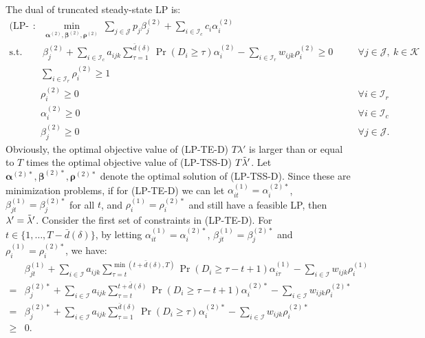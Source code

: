 \documentclass[letterpaper, 10 pt, conference]{ieeeconf}  %
\makeatletter
\renewenvironment{proof}[1][\relax]{\par
  \pushQED{\qed}%
  \normalfont \topsep6\p@\@plus6\p@\relax
  \trivlist
  \item[\hskip\labelsep\itshape
    \ifx#1\relax \proofname\else\proofname{} of #1\fi\@addpunct{.}]\ignorespaces
}{%
  \popQED\endtrivlist\@endpefalse
}
\newcommand{\III}{\mathcal{I}}
\newcommand{\JJJ}{\mathcal{J}}
\newcommand{\KKK}{\mathcal{K}}
\theoremstyle{plain}
\theoremstyle{definition}
\theoremstyle{remark}
\makeatother
\begin{document}
\begin{proof}
The dual of truncated steady-state LP is:
\begin{subequations}
\begin{alignat}{2}
\text{(LP-TSS-D)}: &~\min\limits_{\boldsymbol{\alpha}^{(2)}, \boldsymbol{\beta}^{(2)}, \boldsymbol{\rho}^{(2)}}  ~ \sum_{j \in \JJJ} p_j \beta^{(2)}_j + \sum_{i \in \III_c} c_i \alpha^{(2)}_i & \nonumber \\
\text{s.t.}  &~\beta^{(2)}_j + \sum_{i \in \III_c} a_{ijk} \sum^{\bar{d}(\delta)}_{\tau = 1} \Pr(D_{i} \geq \tau) \alpha^{(2)}_i - \sum_{i \in \III_r} w_{ijk} \rho^{(2)}_i \geq 0   &\quad &\forall j \in \JJJ, ~k \in \KKK   \nonumber\\
&\sum_{i \in \III_r} \rho^{(2)}_i \geq 1   & \nonumber\\
&\rho^{(2)}_i \geq 0  &\quad &\forall i \in \III_r \nonumber\\
&\alpha^{(2)}_i \geq 0   &\quad &\forall i \in \III_c \nonumber\\
&\beta^{(2)}_j \geq 0      &\quad &\forall j\in \JJJ \nonumber.
\end{alignat}
\end{subequations}
Obviously, the optimal objective value of (LP-TE-D) $T \lambda'$ is larger than or equal to $T$ times the optimal objective value of (LP-TSS-D) $T \Tilde{\lambda}'$. Let $\boldsymbol{\alpha}^{(2)*}, \boldsymbol{\beta}^{(2)*}, \boldsymbol{\rho}^{(2)*}$ denote the optimal solution of (LP-TSS-D). Since these are minimization problems, if for (LP-TE-D) we can let $\alpha^{(1)}_{it}=\alpha^{(2)*}_i$, $\beta^{(1)}_{jt}=\beta^{(2)*}_j$ for all $t$, and $\rho^{(1)}_i=\rho^{(2)*}_i$ and still have a feasible LP, then $\lambda'=\Tilde{\lambda}'$. Consider the first set of constraints in (LP-TE-D). For $t \in \{1, \ldots, T-\bar{d}(\delta)\}$, by letting $\alpha^{(1)}_{it}=\alpha^{(2)*}_i$, $\beta^{(1)}_{jt}=\beta^{(2)*}_j$ and $\rho^{(1)}_i=\rho^{(2)*}_i$, we have:
\begin{subequations}
\begin{alignat}{2}
& \beta^{(1)}_{jt} + \sum_{i \in \III} a_{ijk} \sum^{\min(t+\bar{d}(\delta),T)}_{\tau=t} \Pr(D_{i} \geq \tau-t+1)  \alpha^{(1)}_{i \tau} - \sum_{i \in \III} w_{ijk} \rho^{(1)}_i \nonumber \\
= & \beta^{(2)*}_j + \sum_{i \in \III} a_{ijk} \sum^{t+\bar{d}(\delta)}_{\tau = t} \Pr(D_{i} \geq \tau-t+1) \alpha^{(2)*}_i - \sum_{i \in \III} w_{ijk} \rho^{(2)*}_i \nonumber \\
= & \beta^{(2)*}_j + \sum_{i \in \III} a_{ijk} \sum^{\bar{d}(\delta)}_{\tau = 1} \Pr(D_{i} \geq \tau) \alpha^{(2)*}_i - \sum_{i \in \III} w_{ijk} \rho^{(2)*}_i \nonumber \\
\geq & 0. \nonumber
\end{alignat}
\end{subequations}


\end{proof}
\end{document}
